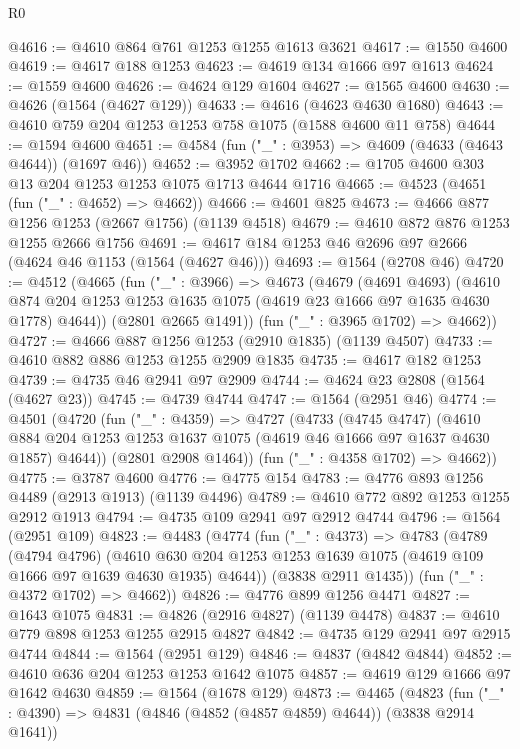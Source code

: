 \begin{lexlean}{R0}
\begin{coremodule}
@4616 := @4610 @864 @761 @1253 @1255 @1613 @3621
@4617 := @1550 @4600
@4619 := @4617 @188 @1253
@4623 := @4619 @134 @1666 @97 @1613
@4624 := @1559 @4600
@4626 := @4624 @129 @1604
@4627 := @1565 @4600
@4630 := @4626 (@1564 (@4627 @129))
@4633 := @4616 (@4623 @4630 @1680)
@4643 := @4610 @759 @204 @1253 @1253 @758 @1075 (@1588 @4600 @11 @758)
@4644 := @1594 @4600
@4651 := @4584 (fun ("_" : @3953) => @4609 (@4633 (@4643 @4644)) (@1697 @46))
@4652 := @3952 @1702
@4662 := @1705 @4600 @303 @13 @204 @1253 @1253 @1075 @1713 @4644 @1716
@4665 := @4523 (@4651 (fun ("_" : @4652) => @4662))
@4666 := @4601 @825
@4673 := @4666 @877 @1256 @1253 (@2667 @1756) (@1139 @4518)
@4679 := @4610 @872 @876 @1253 @1255 @2666 @1756
@4691 := @4617 @184 @1253 @46 @2696 @97 @2666 (@4624 @46 @1153 (@1564 (@4627 @46)))
@4693 := @1564 (@2708 @46)
@4720 := @4512
    (@4665
      (fun ("_" : @3966) =>
      @4673
        (@4679
          (@4691 @4693)
          (@4610 @874 @204 @1253 @1253 @1635 @1075 (@4619 @23 @1666 @97 @1635 @4630 @1778) @4644))
        (@2801 @2665 @1491))
      (fun ("_" : @3965 @1702) => @4662))
@4727 := @4666 @887 @1256 @1253 (@2910 @1835) (@1139 @4507)
@4733 := @4610 @882 @886 @1253 @1255 @2909 @1835
@4735 := @4617 @182 @1253
@4739 := @4735 @46 @2941 @97 @2909
@4744 := @4624 @23 @2808 (@1564 (@4627 @23))
@4745 := @4739 @4744
@4747 := @1564 (@2951 @46)
@4774 := @4501
    (@4720
      (fun ("_" : @4359) =>
      @4727
        (@4733
          (@4745 @4747)
          (@4610 @884 @204 @1253 @1253 @1637 @1075 (@4619 @46 @1666 @97 @1637 @4630 @1857) @4644))
        (@2801 @2908 @1464))
      (fun ("_" : @4358 @1702) => @4662))
@4775 := @3787 @4600
@4776 := @4775 @154
@4783 := @4776 @893 @1256 @4489 (@2913 @1913) (@1139 @4496)
@4789 := @4610 @772 @892 @1253 @1255 @2912 @1913
@4794 := @4735 @109 @2941 @97 @2912 @4744
@4796 := @1564 (@2951 @109)
@4823 := @4483
    (@4774
      (fun ("_" : @4373) =>
      @4783
        (@4789
          (@4794 @4796)
          (@4610 @630 @204 @1253 @1253 @1639 @1075 (@4619 @109 @1666 @97 @1639 @4630 @1935) @4644))
        (@3838 @2911 @1435))
      (fun ("_" : @4372 @1702) => @4662))
@4826 := @4776 @899 @1256 @4471
@4827 := @1643 @1075
@4831 := @4826 (@2916 @4827) (@1139 @4478)
@4837 := @4610 @779 @898 @1253 @1255 @2915 @4827
@4842 := @4735 @129 @2941 @97 @2915 @4744
@4844 := @1564 (@2951 @129)
@4846 := @4837 (@4842 @4844)
@4852 := @4610 @636 @204 @1253 @1253 @1642 @1075
@4857 := @4619 @129 @1666 @97 @1642 @4630
@4859 := @1564 (@1678 @129)
@4873 := @4465
    (@4823
      (fun ("_" : @4390) => @4831 (@4846 (@4852 (@4857 @4859) @4644)) (@3838 @2914 @1641))

\end{coremodule}
\end{lexlean}
